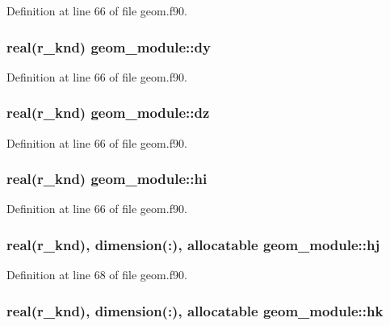 Definition at line 66 of file geom.\-f90.

\hypertarget{classgeom__module_a13234163c83c1041d8053ab0f4ea5d40}{
\subsubsection[{dy}]{\setlength{\rightskip}{0pt plus 5cm}real(r\-\_\-knd) geom\-\_\-module\-::dy}}\label{classgeom__module_a13234163c83c1041d8053ab0f4ea5d40}


Definition at line 66 of file geom.\-f90.

\hypertarget{classgeom__module_a59842db695f66127f749bffd9df2f034}{
\subsubsection[{dz}]{\setlength{\rightskip}{0pt plus 5cm}real(r\-\_\-knd) geom\-\_\-module\-::dz}}\label{classgeom__module_a59842db695f66127f749bffd9df2f034}


Definition at line 66 of file geom.\-f90.

\hypertarget{classgeom__module_af657687714307a2bfe5e99ea8ee9f35e}{
\subsubsection[{hi}]{\setlength{\rightskip}{0pt plus 5cm}real(r\-\_\-knd) geom\-\_\-module\-::hi}}\label{classgeom__module_af657687714307a2bfe5e99ea8ee9f35e}


Definition at line 66 of file geom.\-f90.

\hypertarget{classgeom__module_ad5db4c62807a7025e92dd2c5742156eb}{
\subsubsection[{hj}]{\setlength{\rightskip}{0pt plus 5cm}real(r\-\_\-knd), dimension(\-:), allocatable geom\-\_\-module\-::hj}}\label{classgeom__module_ad5db4c62807a7025e92dd2c5742156eb}


Definition at line 68 of file geom.\-f90.

\hypertarget{classgeom__module_a42bd1a5bffae9b223ac63ce018664023}{
\subsubsection[{hk}]{\setlength{\rightskip}{0pt plus 5cm}real(r\-\_\-knd), dimension(\-:), allocatable geom\-\_\-module\-::hk}}\label{classgeom__module_a42bd1a5bffae9b223ac63ce018664023}


